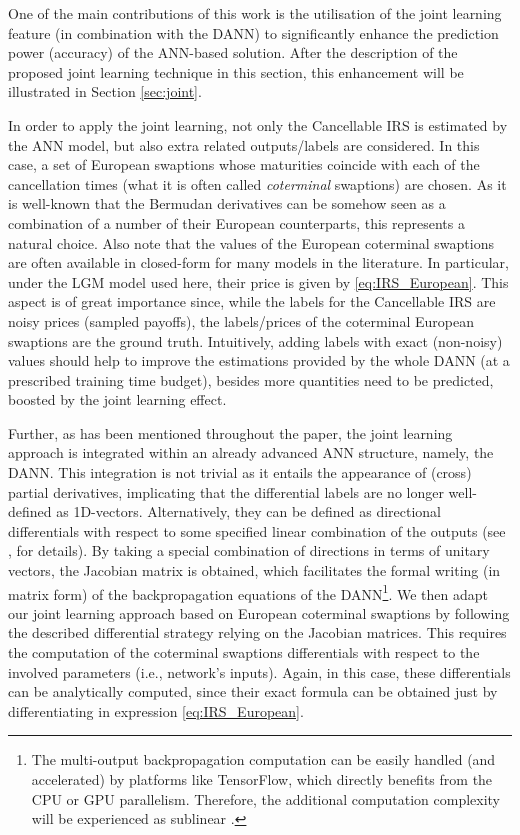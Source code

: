         One of the main contributions of this work is the utilisation of the joint learning feature (in combination with the DANN) to significantly enhance the prediction power (accuracy) of the ANN-based solution. After the description of the proposed joint learning technique in this section, this enhancement will be illustrated in Section \ref{sec:joint}.

        In order to apply the joint learning, not only the Cancellable IRS is estimated by the ANN model, but also extra related outputs/labels are considered. In this case, a set of European swaptions whose maturities coincide with each of the cancellation times (what it is often called \emph{coterminal} swaptions) are chosen. As it is well-known that the Bermudan derivatives can be somehow seen as a combination of a number of their European counterparts, this represents a natural choice. Also note that the values of the European coterminal swaptions are often available in closed-form for many models in the literature. In particular, under the LGM model used here, their price is given by \eqref{eq:IRS_European}. This aspect is of great importance since, while the labels for the Cancellable IRS are noisy prices (sampled payoffs), the labels/prices of the coterminal European swaptions are the ground truth. Intuitively, adding labels with exact (non-noisy) values should help to improve the estimations provided by the whole DANN (at a prescribed training time budget), besides more quantities need to be predicted, boosted by the joint learning effect.

        Further, as has been mentioned throughout the paper, the joint learning approach is integrated within an already advanced ANN structure, namely, the DANN. This integration is not trivial as it entails the appearance of (cross) partial derivatives, implicating that the differential labels are no longer well-defined as 1D-vectors. Alternatively, they can be defined as directional differentials with respect to some specified linear combination of the outputs (see \cite{huge2020}, for details). By taking a special combination of directions in terms of unitary vectors, the Jacobian matrix is obtained, which facilitates the formal writing (in matrix form) of the backpropagation equations of the DANN\footnote{The multi-output backpropagation computation can be easily handled (and accelerated) by platforms like TensorFlow, which directly benefits from the CPU or GPU parallelism. Therefore, the additional computation complexity will be experienced as sublinear \cite{huge2020}.}. We then adapt our joint learning approach based on European coterminal swaptions by following the described differential strategy relying on the Jacobian matrices. This requires the computation of the coterminal swaptions differentials with respect to the involved parameters (i.e., network's inputs). Again, in this case, these differentials can be analytically computed, since their exact formula can be obtained just by differentiating in expression \eqref{eq:IRS_European}.

